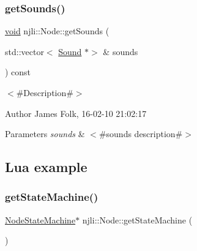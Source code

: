 \begin{DoxyCodeInclude}
\end{DoxyCodeInclude}
\mbox{\label{classnjli_1_1_node_aa696bbf821649390f3104ccbb7e82e66}} 
\subsubsection{\texorpdfstring{get\+Sounds()}{getSounds()}}
{\footnotesize\ttfamily \mbox{\hyperlink{_thread_8h_af1e856da2e658414cb2456cb6f7ebc66}{void}} njli\+::\+Node\+::get\+Sounds (\begin{DoxyParamCaption}\item[{std\+::vector$<$ \mbox{\hyperlink{classnjli_1_1_sound}{Sound}} $\ast$$>$ \&}]{sounds }\end{DoxyParamCaption}) const}



$<$\#\+Description\#$>$ 

\begin{DoxyAuthor}{Author}
James Folk, 16-\/02-\/10 21\+:02\+:17
\end{DoxyAuthor}

\begin{DoxyParams}{Parameters}
{\em sounds} & $<$\#sounds description\#$>$\\
\hline
\end{DoxyParams}
\hypertarget{classnjli_1_1_steering_behavior_wander_ex1}{}\subsection{Lua example}\label{classnjli_1_1_steering_behavior_wander_ex1}

\begin{DoxyCodeInclude}
\end{DoxyCodeInclude}
\mbox{\label{classnjli_1_1_node_a0e952bbd0ad0bbbe33f42639b9af844f}} 
\subsubsection{\texorpdfstring{get\+State\+Machine()}{getStateMachine()}\hspace{0.1cm}{\footnotesize\ttfamily [1/2]}}
{\footnotesize\ttfamily \mbox{\hyperlink{classnjli_1_1_node_state_machine}{Node\+State\+Machine}}$\ast$ njli\+::\+Node\+::get\+State\+Machine (\begin{DoxyParamCaption}{ }\end{DoxyParamCaption})}



